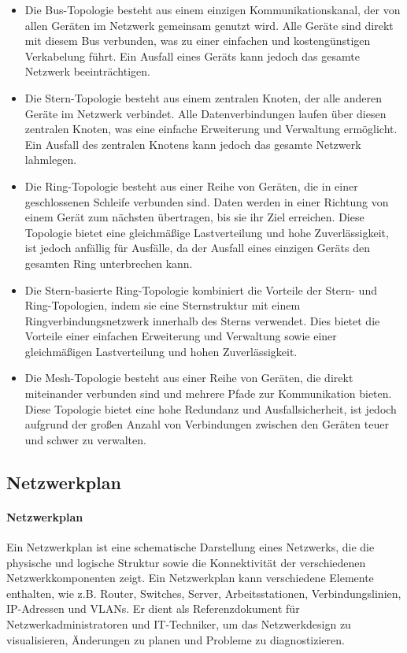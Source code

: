 \begin{itemize}
	\item Die Bus-Topologie besteht aus einem einzigen Kommunikationskanal, der von allen Geräten im Netzwerk gemeinsam genutzt wird. Alle Geräte sind direkt mit diesem Bus verbunden, was zu einer einfachen und kostengünstigen Verkabelung führt. Ein Ausfall eines Geräts kann jedoch das gesamte Netzwerk beeinträchtigen.
	\item Die Stern-Topologie besteht aus einem zentralen Knoten, der alle anderen Geräte im Netzwerk verbindet. Alle Datenverbindungen laufen über diesen zentralen Knoten, was eine einfache Erweiterung und Verwaltung ermöglicht. Ein Ausfall des zentralen Knotens kann jedoch das gesamte Netzwerk lahmlegen.
	\item Die Ring-Topologie besteht aus einer Reihe von Geräten, die in einer geschlossenen Schleife verbunden sind. Daten werden in einer Richtung von einem Gerät zum nächsten übertragen, bis sie ihr Ziel erreichen. Diese Topologie bietet eine gleichmäßige Lastverteilung und hohe Zuverlässigkeit, ist jedoch anfällig für Ausfälle, da der Ausfall eines einzigen Geräts den gesamten Ring unterbrechen kann.
	\item Die Stern-basierte Ring-Topologie kombiniert die Vorteile der Stern- und Ring-Topologien, indem sie eine Sternstruktur mit einem Ringverbindungsnetzwerk innerhalb des Sterns verwendet. Dies bietet die Vorteile einer einfachen Erweiterung und Verwaltung sowie einer gleichmäßigen Lastverteilung und hohen Zuverlässigkeit.
	\item Die Mesh-Topologie besteht aus einer Reihe von Geräten, die direkt miteinander verbunden sind und mehrere Pfade zur Kommunikation bieten. Diese Topologie bietet eine hohe Redundanz und Ausfallsicherheit, ist jedoch aufgrund der großen Anzahl von Verbindungen zwischen den Geräten teuer und schwer zu verwalten.
\end{itemize}

\subsection{Netzwerkplan}

\paragraph{Netzwerkplan}

Ein Netzwerkplan ist eine schematische Darstellung eines Netzwerks, die die physische und logische Struktur sowie die Konnektivität der verschiedenen Netzwerkkomponenten zeigt. Ein Netzwerkplan kann verschiedene Elemente enthalten, wie z.B. Router, Switches, Server, Arbeitsstationen, Verbindungslinien, IP-Adressen und VLANs. Er dient als Referenzdokument für Netzwerkadministratoren und IT-Techniker, um das Netzwerkdesign zu visualisieren, Änderungen zu planen und Probleme zu diagnostizieren.

